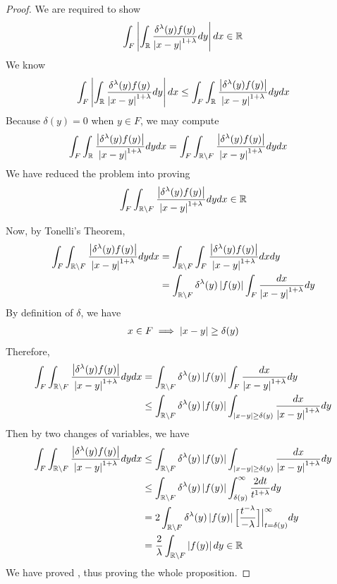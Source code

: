 \documentclass{report}
\begin{document}
\begin{proof}
We are required to show 
\begin{align*}
  \int_F \left|\int_{\mathbb{R}} \frac{\delta ^{\lambda }(y)f(y)}{\left|x-y\right|^{1+\lambda }} dy\right| dx \in\mathbb{R}
\end{align*}
We know 
\begin{align*}
  \int_F \left|\int_{\mathbb{R}} \frac{\delta ^{\lambda }(y)f(y)}{\left|x-y\right|^{1+\lambda }} dy\right| dx  \leq  \int_F \int_{\mathbb{R}}  \frac{\left|\delta ^{\lambda }(y)f(y)\right|}{\left|x-y\right|^{1+\lambda }} dy dx
\end{align*}
Because $\delta(y)=0$ when $y \in F$, we may compute 
\begin{align*}
  \int_F \int_{\mathbb{R}} \frac{\left|\delta ^{\lambda }(y)f(y)\right|}{\left|x-y\right|^{1+\lambda }} dy dx &= \int_F \int_{\mathbb{R} \setminus F} \frac{\left|\delta ^{\lambda }(y)f(y)\right|}{\left|x-y\right|^{1+\lambda }} dy dx 
\end{align*}
We have reduced the problem into proving 
\begin{align}
\label{go}
\int_F \int_{\mathbb{R} \setminus F} \frac{\left|\delta ^{\lambda }(y)f(y)\right|}{\left|x-y\right|^{1+\lambda }} dydx \in\mathbb{R}
\end{align}

Now, by Tonelli's Theorem, 
\begin{align*}
  \int_F \int_{\mathbb{R} \setminus F} \frac{\left|\delta ^{\lambda }(y)f(y)\right|}{\left|x-y\right|^{1+\lambda }} dy dx &= \int_{\mathbb{R} \setminus F}\int_F \frac{\left|\delta ^{\lambda }(y)f(y)\right|}{\left|x-y\right|^{1+\lambda }} dx dy   \\
&=\int_{\mathbb{R} \setminus F} \delta ^{\lambda }(y)\left|f(y)\right| \int_F \frac{dx}{\left|x-y\right|^{1+ \lambda }} dy
\end{align*}
By definition of $\delta$, we have 
\begin{align*}
x \in F  \implies \left|x-y\right|\geq \delta (y)
\end{align*}
Therefore, 
\begin{align*}
  \int_F \int_{\mathbb{R} \setminus F} \frac{\left|\delta ^{\lambda }(y)f(y)\right|}{\left|x-y\right|^{1+\lambda }} dy dx&= \int_{\mathbb{R} \setminus F} \delta ^{\lambda }(y)\left|f(y)\right| \int_F \frac{dx}{\left|x-y\right|^{1+ \lambda }} dy \\
 &\leq \int_{\mathbb{R} \setminus F} \delta ^{\lambda }(y)\left|f(y)\right| \int_{\left|x-y\right| \geq \delta (y)} \frac{dx}{\left|x-y\right|^{1+ \lambda }} dy 
\end{align*}
Then by two changes of variables, we have 
\begin{align*}
  \int_F \int_{\mathbb{R} \setminus F} \frac{\left|\delta ^{\lambda }(y)f(y)\right|}{\left|x-y\right|^{1+\lambda }} dy dx &\leq \int_{\mathbb{R} \setminus F} \delta ^{\lambda }(y)\left|f(y)\right| \int_{\left|x-y\right| \geq \delta (y)} \frac{dx}{\left|x-y\right|^{1+ \lambda }} dy \\
 &\leq  \int_{\mathbb{R} \setminus F} \delta ^{\lambda }(y)\left|f(y)\right| \int_{\delta(y)}^{\infty} \frac{2dt}{t^{1+ \lambda }} dy  \\
 &=2\int_{\mathbb{R} \setminus F} \delta ^{\lambda }(y)\left|f(y)\right| \Big[ \frac{t ^{-\lambda }}{- \lambda } \Big]\Big|_{t= \delta (y)}^{\infty} dy \\
 & =\frac{2}{\lambda }\int_{\mathbb{R} \setminus F}\left|f(y)\right|dy \in\mathbb{R}
\end{align*}
We have proved , thus proving the whole proposition. 
\end{proof}
\end{document}
